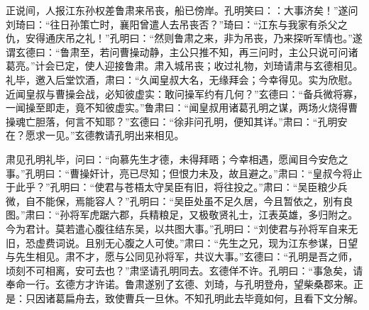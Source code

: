正说间，人报江东孙权差鲁肃来吊丧，船已傍岸。孔明笑曰：：大事济矣！”遂问刘琦曰：“往日孙策亡时，襄阳曾遣人去吊丧否？”琦曰：“江东与我家有杀父之仇，安得通庆吊之礼！”孔明曰：“然则鲁肃之来，非为吊丧，乃来探听军情也。”遂谓玄德曰：“鲁肃至，若问曹操动静，主公只推不知，再三问时，主公只说可问诸葛亮。”计会已定，使人迎接鲁肃。肃入城吊丧；收过礼物，刘琦请肃与玄德相见。礼毕，邀入后堂饮酒，肃曰：“久闻皇叔大名，无缘拜会；今幸得见。实为欣慰。近闻皇叔与曹操会战，必知彼虚实：敢问操军约有几何？”玄德曰：“备兵微将寡，一闻操至即走，竟不知彼虚实。”鲁肃曰：“闻皇叔用诸葛孔明之谋，两场火烧得曹操魂亡胆落，何言不知耶？”玄德曰：“徐非问孔明，便知其详。”肃曰：“孔明安在？愿求一见。”玄德教请孔明出来相见。

肃见孔明礼毕，问曰：“向慕先生才德，未得拜晤；今幸相遇，愿闻目今安危之事。”孔明曰：“曹操奸计，亮已尽知；但恨力未及，故且避之。”肃曰：“皇叔今将止于此乎？”孔明曰：“使君与苍梧太守吴臣有旧，将往投之。”肃曰：“吴臣粮少兵微，自不能保，焉能容人？”孔明曰：“吴臣处虽不足久居，今且暂依之，别有良图。”肃曰：“孙将军虎踞六郡，兵精粮足，又极敬贤礼士，江表英雄，多归附之。今为君计。莫若遣心腹往结东吴，以共图大事。”孔明曰：“刘使君与孙将军自来无旧，恐虚费词说。且别无心腹之人可使。”肃曰：“先生之兄，现为江东参谋，日望与先生相见。肃不才，愿与公同见孙将军，共议大事。”玄德曰：“孔明是吾之师，顷刻不可相离，安可去也？”肃坚请孔明同去。玄德佯不许。孔明曰：“事急矣，请奉命一行。玄德方才许诺。鲁肃遂别了玄德、刘琦，与孔明登舟，望柴桑郡来。正是：只因诸葛扁舟去，致使曹兵一旦休。不知孔明此去毕竟如何，且看下文分解。